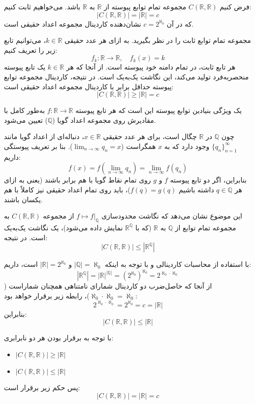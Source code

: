 فرض کنیم $C(\mathbb{R}, \mathbb{R})$ مجموعه تمام توابع پیوسته از $\mathbb{R}$ به $\mathbb{R}$ باشد. می‌خواهیم ثابت کنیم:
\[
|C(\mathbb{R}, \mathbb{R})| = |\mathbb{R}| = c
\]
که در آن $c = 2^{\aleph_0}$ نشان‌دهنده کاردینال مجموعه اعداد حقیقی است.

مجموعه تمام توابع ثابت را در نظر بگیرید. به ازای هر عدد حقیقی $k \in \mathbb{R}$، می‌توانیم تابع زیر را تعریف کنیم:
\[
f_k: \mathbb{R} \to \mathbb{R}, \quad f_k(x) = k
\]
هر تابع ثابت، در تمام دامنه خود پیوسته است. از آنجا که هر $k \in \mathbb{R}$ یک تابع پیوسته منحصربه‌فرد تولید می‌کند، این نگاشت یک‌به‌یک است. در نتیجه، کاردینال مجموعه توابع پیوسته حداقل برابر با کاردینال مجموعه اعداد حقیقی است:
\[
|C(\mathbb{R}, \mathbb{R})| \ge |\mathbb{R}| = c
\]

یک ویژگی بنیادین توابع پیوسته این است که هر تابع پیوسته $f: \mathbb{R} \to \mathbb{R}$ به‌طور کامل با مقادیرش روی مجموعه اعداد گویا ($\mathbb{Q}$) تعیین می‌شود.

چون $\mathbb{Q}$ در $\mathbb{R}$ چگال است، برای هر عدد حقیقی $x \in \mathbb{R}$، دنباله‌ای از اعداد گویا مانند $\{q_n\}_{n=1}^{\infty}$ وجود دارد که به $x$ همگراست ($\lim_{n \to \infty} q_n = x$). بنا بر تعریف پیوستگی داریم:
\[
f(x) = f\left(\lim_{n \to \infty} q_n\right) = \lim_{n \to \infty} f(q_n)
\]
بنابراین، اگر دو تابع پیوسته $f$ و $g$ روی تمام نقاط گویا با هم برابر باشند (یعنی به ازای هر $q \in \mathbb{Q}$ داشته باشیم $f(q) = g(q)$)، باید روی تمام اعداد حقیقی نیز کاملاً با هم یکسان باشند.

این موضوع نشان می‌دهد که نگاشت محدودسازی $f \mapsto f|_\mathbb{Q}$ از مجموعه $C(\mathbb{R}, \mathbb{R})$ به مجموعه تمام توابع از $\mathbb{Q}$ به $\mathbb{R}$ (که با $\mathbb{R}^\mathbb{Q}$ نمایش داده می‌شود)، یک نگاشت یک‌به‌یک است. در نتیجه:
\[
|C(\mathbb{R}, \mathbb{R})| \le |\mathbb{R}^\mathbb{Q}|
\]

با استفاده از محاسبات کاردینالی و با توجه به اینکه $|\mathbb{Q}| = \aleph_0$ و $|\mathbb{R}| = 2^{\aleph_0}$ است، داریم:
\[
|\mathbb{R}^\mathbb{Q}| = |\mathbb{R}|^{|\mathbb{Q}|} = (2^{\aleph_0})^{\aleph_0} = 2^{\aleph_0 \cdot \aleph_0}
\]
از آنجا که حاصل‌ضرب دو کاردینال شمارای نامتناهی همچنان شماراست ($\aleph_0 \cdot \aleph_0 = \aleph_0$)، رابطه زیر برقرار خواهد بود:
\[
2^{\aleph_0 \cdot \aleph_0} = 2^{\aleph_0} = c = |\mathbb{R}|
\]
بنابراین:
\[
|C(\mathbb{R}, \mathbb{R})| \le |\mathbb{R}|
\]

با توجه به برقرار بودن هر دو نابرابری:
\begin{itemize}
    \item $|C(\mathbb{R}, \mathbb{R})| \ge |\mathbb{R}|$
    \item $|C(\mathbb{R}, \mathbb{R})| \le |\mathbb{R}|$
\end{itemize}
پس حکم زیر برقرار است:
\[
|C(\mathbb{R}, \mathbb{R})| = |\mathbb{R}| = c
\]

